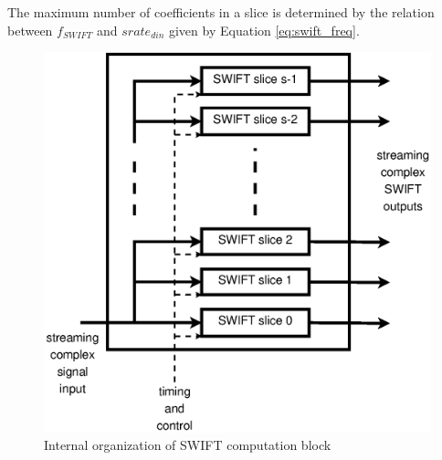 The maximum number of coefficients in a slice is determined by the relation between $f_{SWIFT}$ and $srate_{din}$ given by Equation \ref{eq:swift_freq}. 

\begin{figure}[tbp]
\centering
\includegraphics[width=\columnwidth]{Figures/fig_SWIFT_computation.eps}
\caption{Internal organization of SWIFT computation block}
\label{fig:SWIFT_slices}
\end{figure}



